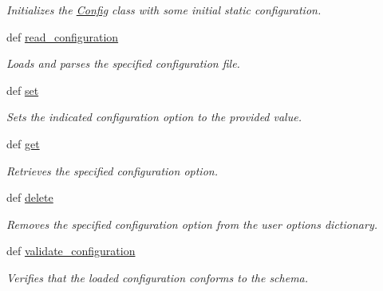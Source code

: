 \begin{DoxyCompactItemize}
\begin{DoxyCompactList}\small\item\em Initializes the \hyperlink{classhwm_1_1core_1_1configuration_1_1_config}{Config} class with some initial static configuration. \end{DoxyCompactList}\item 
def \hyperlink{classhwm_1_1core_1_1configuration_1_1_config_a805d1df7708afb305e85079d729d8369}{read\-\_\-configuration}
\begin{DoxyCompactList}\small\item\em Loads and parses the specified configuration file. \end{DoxyCompactList}\item 
def \hyperlink{classhwm_1_1core_1_1configuration_1_1_config_ac34da53e95cd38ebc84368e42cbcd95a}{set}
\begin{DoxyCompactList}\small\item\em Sets the indicated configuration option to the provided value. \end{DoxyCompactList}\item 
def \hyperlink{classhwm_1_1core_1_1configuration_1_1_config_a384f394128523c4395e4a6e9f3d5d906}{get}
\begin{DoxyCompactList}\small\item\em Retrieves the specified configuration option. \end{DoxyCompactList}\item 
def \hyperlink{classhwm_1_1core_1_1configuration_1_1_config_a59b1c4c8c34be86e011dd9102e07cfbd}{delete}
\begin{DoxyCompactList}\small\item\em Removes the specified configuration option from the user options dictionary. \end{DoxyCompactList}\item 
def \hyperlink{classhwm_1_1core_1_1configuration_1_1_config_ade4f49363d72e1d16a64959e4a8ccd9b}{validate\-\_\-configuration}
\begin{DoxyCompactList}\small\item\em Verifies that the loaded configuration conforms to the schema. \end{DoxyCompactList}\end{DoxyCompactItemize}
